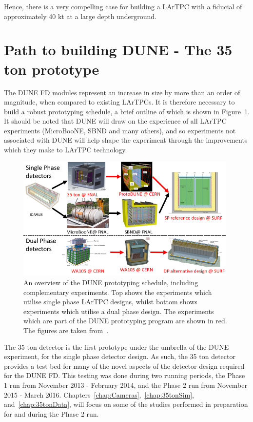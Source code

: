 Hence, there is a very compelling case for building a LArTPC with a fiducial of approximately 40 kt at a large depth underground. \\

\section{Path to building DUNE - The 35 ton prototype} \label{sec:The35tonDetector}  %
The DUNE FD modules represent an increase in size by more than an order of magnitude, when compared to existing LArTPCs. It is therefore necessary to build a robust prototyping schedule, a brief outline of which is shown in Figure~\ref{fig:DUNEProtSched}. It should be noted that DUNE will draw on the experience of all LArTPC experiments (MicroBooNE, SBND and many others), and so experiments not associated with DUNE will help shape the experiment through the improvements which they make to LArTPC technology. \\ 

\begin{figure}
  \centering
  \includegraphics[width=0.98\textwidth]{PrototypeSched}
  \caption[An overview of the DUNE prototyping schedule, including complementary experiments]
          {An overview of the DUNE prototyping schedule, including complementary experiments. Top shows the experiments which utilise single phase LArTPC designs, whilst bottom shows experiments which utilise a dual phase design. The experiments which are part of the DUNE prototyping program are shown in red. The figures are taken from~\citep{MarkReviewJuly2015, DUNECDR_V4}.}
  \label{fig:DUNEProtSched}
\end{figure}

The 35 ton detector is the first prototype under the umbrella of the DUNE experiment, for the single phase detector design. As such, the 35 ton detector provides a test bed for many of the novel aspects of the detector design required for the DUNE FD. This testing was done during two running periods, the Phase 1 run from November 2013 - February 2014, and the Phase 2 run from November 2015 - March 2016. Chapters~\ref{chap:Cameras},~\ref{chap:35tonSim}, and~\ref{chap:35tonData}, will focus on some of the studies performed in preparation for and during the Phase 2 run. \\ 

